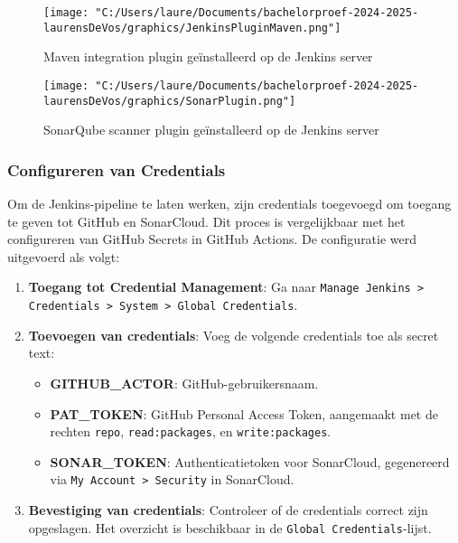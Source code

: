\begin{figure}[h!]
    \centering
    \texttt{[image: "C:/Users/laure/Documents/bachelorproef-2024-2025-laurensDeVos/graphics/JenkinsPluginMaven.png"]}
    \caption{Maven integration plugin geïnstalleerd op de Jenkins server}
    \label{fig:install_Maven}
\end{figure}

\begin{figure}[h!]
    \centering
    \texttt{[image: "C:/Users/laure/Documents/bachelorproef-2024-2025-laurensDeVos/graphics/SonarPlugin.png"]}
    \caption{SonarQube scanner plugin geïnstalleerd op de Jenkins server}
    \label{fig:install_Sonar}
\end{figure}

\subsubsection{Configureren van Credentials}

Om de Jenkins-pipeline te laten werken, zijn credentials toegevoegd om toegang te geven tot GitHub en SonarCloud. Dit proces is vergelijkbaar met het configureren van GitHub Secrets in GitHub Actions. De configuratie werd uitgevoerd als volgt:

\begin{enumerate}
    \item \textbf{Toegang tot Credential Management}:
    Ga naar \texttt{Manage Jenkins > Credentials > System > Global Credentials}.
    \item \textbf{Toevoegen van credentials}:
    Voeg de volgende credentials toe als secret text:
    \begin{itemize}
        \item \textbf{GITHUB\_ACTOR}: GitHub-gebruikersnaam.
        \item \textbf{PAT\_TOKEN}: GitHub Personal Access Token, aangemaakt met de rechten \texttt{repo}, \texttt{read:packages}, en \texttt{write:packages}.
        \item \textbf{SONAR\_TOKEN}: Authenticatietoken voor SonarCloud, gegenereerd via \texttt{My Account > Security} in SonarCloud.
    \end{itemize}
    \item \textbf{Bevestiging van credentials}:
    Controleer of de credentials correct zijn opgeslagen. Het overzicht is beschikbaar in de \texttt{Global Credentials}-lijst.
\end{enumerate}

